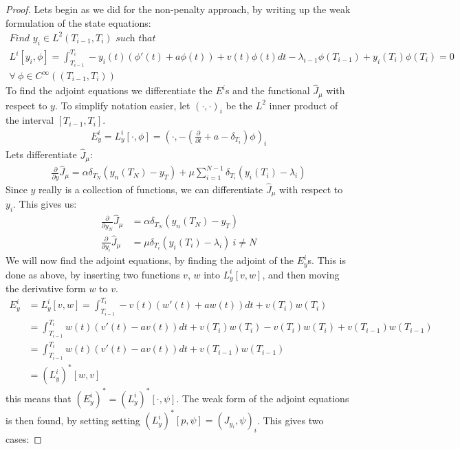 \begin{proof}
Lets begin as we did for the non-penalty approach, by writing up the weak formulation of the state equations:
\begin{gather*}
\textit{Find $y_i \in L^2(T_{i-1},T_i)$ such that }\\
L^i[y_i,\phi] = \int_{T_{i-1}}^{T_{i}}-y_i(t)(\phi'(t) +a \phi(t))+v(t)\phi(t)dt -\lambda_{i-1}\phi(T_{i-1})+ y_i(T_i)\phi(T_i) =0\\ \forall \ \phi \in C^{\infty}((T_{i-1},T_{i}))
\end{gather*} 
To find the adjoint equations we differentiate the $E^i$s and the functional $\hat J_{\mu}$ with respect to $y$. To simplify notation easier, let $(\cdot,\cdot)_i$ be the $L^2$ inner product of the interval $[T_{i-1},T_i]$. 
\begin{align*}
E_y^i=L_y^i[\cdot,\phi]=(\cdot,-(\frac{\partial}{\partial t} + a - \delta_{T_i})\phi)_i 
\end{align*}
Lets differentiate $\hat J_{\mu}$:
\begin{align*}
\frac{\partial}{\partial y} \hat J_{\mu}= \alpha\delta_{T_{N}}(y_n(T_{N})-y_T) + \mu \sum_{i=1}^{N-1} \delta_{T_{i}}(y_{i}(T_i)-\lambda_i ) 
\end{align*}
Since $y$ really is a collection of functions, we can differentiate $\hat J_{\mu}$ with respect to $y_i$. This gives us:
\begin{align*}
\frac{\partial}{\partial y_N}\hat J_{\mu}&= \alpha\delta_{T_{N}}(y_n(T_{N})-y_T) \\
\frac{\partial}{\partial y_i}\hat J_{\mu} &= \mu\delta_{T_{i}}(y_{i}(T_i)-\lambda_i ) \ i\neq N
\end{align*}
We will now find the adjoint equations, by finding the adjoint of the $E_y^i$s. This is done as above, by inserting two functions $v$, $w$ into $L_y^i[v,w]$, and then moving the derivative form $w$ to $v$.
\begin{align*}
E_y^i&=L_y^i[v,w]=\int_{T_{i-1}}^{T_i}-v(t)(w'(t)+a w(t))dt + v(T_i)w(T_i) \\
&=\int_{T_{i-1}}^{T_i}w(t)(v'(t)-av(t))dt + v(T_i)w(T_i)-v(T_i)w(T_i) +v(T_{i-1})w(T_{i-1}) \\
&=\int_{T_{i-1}}^{T_i}w(t)(v'(t)-a v(t))dt + v(T_{i-1})w(T_{i-1}) \\
&=(L_y^i)^*[w,v]
\end{align*}
this means that $(E_y^i)^*=(L_y^i)^*[\cdot,\psi]$. The weak form of the adjoint equations is then found, by setting setting $(L_y^i)^*[p,\psi]=(J_{y_i},\psi)_i$. This gives two cases:

\end{proof}
